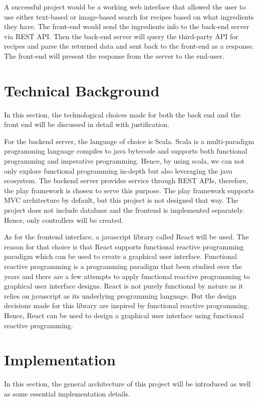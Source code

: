 \documentclass{article}
\begin{document}
\begin{normalsize}
  A successful project would be a working web interface that allowed the user to use either text-based or image-based search for recipes based on what ingredients they have. The front-end would send the ingredients info to the back-end
  server via REST API. Then the back-end server will query the third-party API
  for recipes and parse the returned data and sent back to the front-end as a response. The front-end will present the response from the server to the end-user. 


  \section{Technical Background}
  In this section, the technological choices made for both the back end and
  the front end will be discussed in detail with justification.

  For the backend server, the language of choice is Scala. Scala is a multi-paradigm
  programming language compiles to java bytecode and supports both functional programming and imperative programming. Hence, by using scala, we can not only explore functional programming in-depth but also leveraging the java ecosystem. The backend server provides service through REST APIs, therefore,
  the play framework is chosen to serve this purpose. The play framework supports MVC architecture by default, but this project is not designed that way. The project does not include database and the frontend is implemented separately. Hence, only controllers will be created.

  As for the frontend interface, a javascript library called React will be used.
  The reason for that choice is that React supports functional reactive
  programming paradigm which can be used to create a graphical user interface.
  Functional reactive programming is a programming paradigm that been studied over the years and there are a few attempts to apply functional reactive programming to graphical user interface designs. React is not purely functional by nature as it relies on javascript as its underlying programming language. But the design decisions made for this library are inspired by functional reactive programming. Hence, React can be used to design a graphical user interface using
  functional reactive programming.
  
  \section{Implementation}
  In this section, the general architecture of this project will be introduced
  as well as some essential implementation details.


\end{normalsize}
\end{document}
